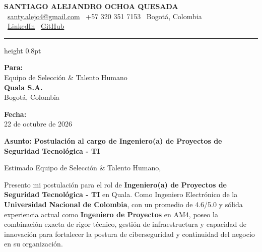 \documentclass[11pt,a4paper]{article}
\begin{document}
\thispagestyle{empty}
\color{darktext}

\begin{center}
    {\Huge \bfseries\color{accent} SANTIAGO ALEJANDRO OCHOA QUESADA} \\[6pt]
    {\small\color{darktext}
    \faEnvelope\ \href{mailto:santy.alejo4@gmail.com}{santy.alejo4@gmail.com}
    \quad\textcolor{bulletline}{\textbar}\quad
    \faPhone\ +57 320 351 7153
    \quad\textcolor{bulletline}{\textbar}\quad
    \faMapMarker*\ Bogotá, Colombia \\[4pt]
    \faLinkedin\ \href{https://linkedin.com/in/santiago-alejandro-ochoa-quesada-a07a18288/}{LinkedIn}
    \quad\textcolor{bulletline}{\textbar}\quad
    \faGithub\ \href{https://github.com/Sochoaq}{GitHub}
    }
\end{center}
\vspace{2pt}
{\color{bulletline}\hrule height 0.8pt}
\vspace{10pt}

\noindent
\begin{minipage}[t]{0.62\textwidth}
    \textbf{\color{accent} Para:}\\
    Equipo de Selección \& Talento Humano\\
    \textbf{Quala S.A.}\\
    Bogotá, Colombia
\end{minipage}
\hfill
\begin{minipage}[t]{0.35\textwidth}\raggedleft
    \textbf{\color{accent} Fecha:}\\
    22 de octubre de 2026
\end{minipage}

\vspace{6pt}
\noindent
{\large\bfseries\color{accent} Asunto: Postulación al cargo de Ingeniero(a) de Proyectos de Seguridad Tecnológica - TI}
\vspace{2pt}

\noindent Estimado Equipo de Selección \& Talento Humano,

Presento mi postulación para el rol de \textbf{Ingeniero(a) de Proyectos de Seguridad Tecnológica - TI} en Quala. Como Ingeniero Electrónico de la \textbf{Universidad Nacional de Colombia}, con un promedio de 4.6/5.0 y sólida experiencia actual como \textbf{Ingeniero de Proyectos} en AM4, poseo la combinación exacta de rigor técnico, gestión de infraestructura y capacidad de innovación para fortalecer la postura de ciberseguridad y continuidad del negocio en su organización.
\end{document}
